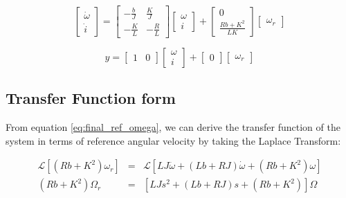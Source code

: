 \documentclass[a4paper, 12pt]{article}
\begin{document}
\begin{equation}
  \left[
  \begin{array}{c}
    \dot \omega \\
    \dot i
  \end{array}
  \right]
  =
  \left[
  \begin{array}{cc}
    -\frac{b}{J} & \frac{K}{J} \\
    -\frac{K}{L} & -\frac{R}{L}
  \end{array}
  \right]
  \left[
  \begin{array}{c}
    \omega \\
    i
  \end{array}
  \right]
  +
  \left[
  \begin{array}{c}
    0 \\
    \frac{Rb + K^2}{LK}
  \end{array}
  \right]
  \left[
  \begin{array}{c}
    \omega_r
  \end{array}
  \right]
  \label{eq:ss_eq1}
\end{equation}

\begin{equation}
  y =
  \left[
  \begin{array}{cc}
    1 & 0
  \end{array}
  \right]
  \left[
  \begin{array}{c}
    \omega \\
    i
  \end{array}
  \right]
  +
  \left[
  \begin{array}{c}
    0
  \end{array}
  \right]
  \left[
  \begin{array}{c}
    \omega_r
  \end{array}
  \right]
  \label{eq:ss_eq2}
\end{equation}

\subsection{Transfer Function form}

From equation \eqref{eq:final_ref_omega}, we can derive the transfer function
of the system in terms of reference angular velocity by taking the Laplace
Transform:

\begin{equation}
  \begin{array}{rcl}
    \mathcal{L}[(Rb + K^2)\omega_r] & = & \mathcal{L}[LJ\ddot\omega + (Lb + RJ)\dot\omega + (Rb + K^2)\omega] \\
    (Rb + K^2)\Omega_r & = & [LJs^2 + (Lb + RJ)s + (Rb + K^2)]\Omega \\
  \end{array}
  \label{eq:ts_initial}
\end{equation}
\end{document}
